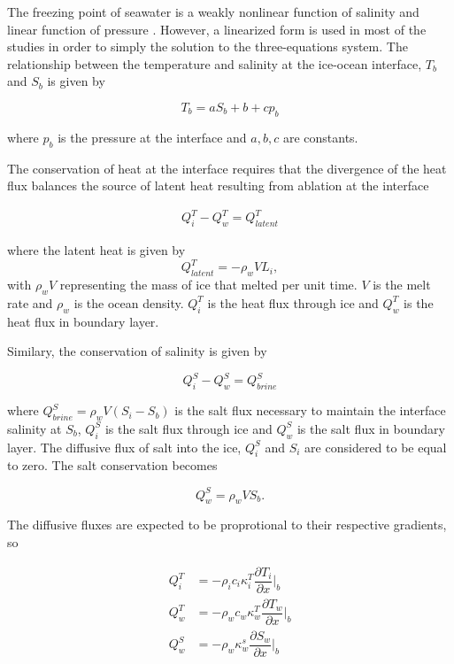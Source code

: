 \documentclass[11pt,a4paper]{article}
\begin{document}
    	The freezing point of seawater is a weakly nonlinear function of salinity and linear function of pressure \citep{millero1978freezing}. However, a linearized form is used in most of the studies in order to simply the solution to the three-equations system. The relationship between the temperature and salinity at the ice-ocean interface, $T_b$ and $S_b$ is given by
		
		\begin{equation}
			\label{eq:1}
			T_b = aS_b+b+cp_b
		\end{equation}
		
		where $p_b$ is the pressure at the interface and $a,b,c$ are constants.
		
		The conservation of heat at the interface requires that the divergence of the heat flux balances the source of latent heat resulting from ablation at the interface
		
		\begin{eqnarray}
			\label{eq:2}
			Q_i^T - Q_w^T = Q_{latent}^T
		\end{eqnarray}
		
		where the latent heat is given by $$Q_{latent}^T = -\rho_wVL_i,$$ with $\rho_wV$ representing the mass of ice that melted per unit time. $V$ is the melt rate and $\rho_w$ is the ocean density. $Q_i^T$ is the heat flux through ice and $ Q_w^T$ is the heat flux in boundary layer.
		
		Similary, the conservation of salinity is given by
		
		\begin{equation}
			Q_i^S - Q_w^S = Q^S_{brine}
		\end{equation}
		
		where $Q_{brine}^S = \rho_wV(S_i-S_b)$ is the salt flux necessary to maintain the interface salinity at $S_b$, $Q_i^S$ is the salt flux through ice and $Q_w^S$ is the salt flux in boundary layer. The diffusive flux of salt into the ice, $Q_i^S$ and $S_i$ are considered to be equal to zero.  The salt conservation becomes 
		
		\begin{equation}
			\label{eq:4}
			Q_w^S = \rho_wVS_b.
		\end{equation}

		The diffusive fluxes are expected to be proprotional to their respective gradients, so
		
		\begin{align}
			\label{eq:tq1}
			Q_i^T &= -\rho_ic_i\kappa_i^T\dfrac{\partial T_i}{\partial x}\bigg|_b\\		
			\label{eq:tq2}	
			Q_w^T& = -\rho_wc_w\kappa_w^T\dfrac{\partial T_w}{\partial x}\bigg|_b\\
			\label{eq:tq3} 
			Q_w^S& = -\rho_w\kappa_w^s\dfrac{\partial S_w}{\partial x}\bigg|_b
		\end{align}
	
\end{document}
